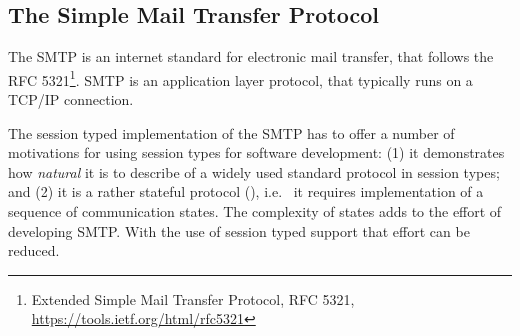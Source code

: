 
\subsection{The Simple Mail Transfer Protocol}
\label{sec:smtp}

The SMTP is an internet standard for electronic
mail transfer, that follows the RFC 5321\footnote{Extended Simple Mail Transfer Protocol, RFC 5321,
\url{https://tools.ietf.org/html/rfc5321}}.
SMTP is an application layer protocol, that typically runs on
a TCP/IP connection.

The session typed implementation of the SMTP has to offer
a number of motivations for using session types for software
development:
(1) it demonstrates how {\em natural} it is
to describe of a widely used standard protocol in session types; and
(2) it is a rather stateful protocol (),
i.e.~ it requires implementation of a sequence of communication states.
The complexity of states adds to the effort of
developing SMTP. With the use of session typed
support that effort can be reduced.


%
%

